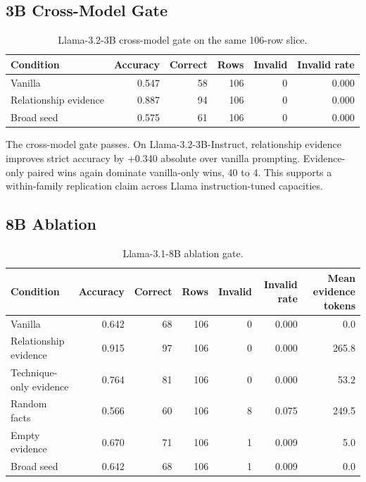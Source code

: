 \documentclass[10pt]{article}
\begin{document}
\subsection{3B Cross-Model Gate}

\begin{table}[t]
  \centering
  \caption{Llama-3.2-3B cross-model gate on the same 106-row slice.}
  \label{tab:crossmodel}
  \begin{tabular}{lrrrrr}
    \toprule
    Condition & Accuracy & Correct & Rows & Invalid & Invalid rate \\
    \midrule
    Vanilla & 0.547 & 58 & 106 & 0 & 0.000 \\
    Relationship evidence & 0.887 & 94 & 106 & 0 & 0.000 \\
    Broad seed & 0.575 & 61 & 106 & 0 & 0.000 \\
    \bottomrule
  \end{tabular}
\end{table}

The cross-model gate passes.
On Llama-3.2-3B-Instruct, relationship evidence improves strict accuracy by +0.340 absolute over vanilla prompting.
Evidence-only paired wins again dominate vanilla-only wins, 40 to 4.
This supports a within-family replication claim across Llama instruction-tuned capacities.

\subsection{8B Ablation}

\begin{table}[t]
  \centering
  \caption{Llama-3.1-8B ablation gate.}
  \label{tab:ablation}
  \begin{tabular}{lrrrrrr}
    \toprule
    Condition & Accuracy & Correct & Rows & Invalid & Invalid rate & Mean evidence tokens \\
    \midrule
    Vanilla & 0.642 & 68 & 106 & 0 & 0.000 & 0.0 \\
    Relationship evidence & 0.915 & 97 & 106 & 0 & 0.000 & 265.8 \\
    Technique-only evidence & 0.764 & 81 & 106 & 0 & 0.000 & 53.2 \\
    Random facts & 0.566 & 60 & 106 & 8 & 0.075 & 249.5 \\
    Empty evidence & 0.670 & 71 & 106 & 1 & 0.009 & 5.0 \\
    Broad seed & 0.642 & 68 & 106 & 1 & 0.009 & 0.0 \\
    \bottomrule
  \end{tabular}
\end{table}
\end{document}
